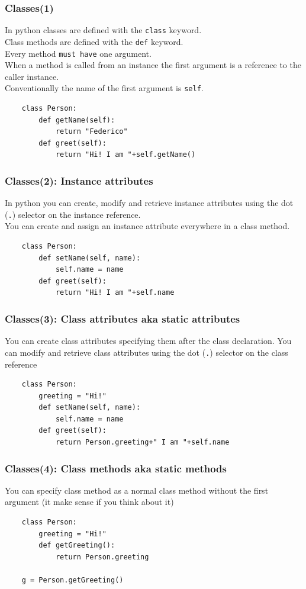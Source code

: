 \documentclass{beamer}
\begin{document}
\begin{frame}[fragile]
    \frametitle{Classes(1)}
    In python classes are defined with the \texttt{class} keyword.\\
    Class methods are defined with the \texttt{def} keyword.\\
    Every method \texttt{must have} one argument.\\
    When a method is called from an instance the first argument is a reference to the caller instance.\\
    Conventionally the name of the first argument is \texttt{self}.\\
    \begin{verbatim}
    class Person:
        def getName(self):
            return "Federico"
        def greet(self):
            return "Hi! I am "+self.getName()
    \end{verbatim}
\end{frame}

\begin{frame}[fragile]
    \frametitle{Classes(2): Instance attributes}
    In python you can create, modify and retrieve instance attributes using the dot (\texttt{.}) selector on the instance reference.\\
    You can create and assign an instance attribute everywhere in a class method.
    \begin{verbatim}
    class Person:
        def setName(self, name):
            self.name = name
        def greet(self):
            return "Hi! I am "+self.name
    \end{verbatim}
\end{frame}

\begin{frame}[fragile]
    \frametitle{Classes(3): Class attributes aka static attributes}
    You can create class attributes specifying them after the class declaration. 
    You can modify and retrieve class attributes using the dot (\texttt{.}) selector on the class reference
    \begin{verbatim}
    class Person:
        greeting = "Hi!"
        def setName(self, name):
            self.name = name
        def greet(self):
            return Person.greeting+" I am "+self.name
    \end{verbatim}
\end{frame}

\begin{frame}[fragile]
    \frametitle{Classes(4): Class methods aka static methods}
    You can specify class method as a normal class method without the first argument (it make sense if you think about it)
    \begin{verbatim}
    class Person:
        greeting = "Hi!"
        def getGreeting():
            return Person.greeting
    
    g = Person.getGreeting()
    \end{verbatim}
\end{frame}
\end{document}
